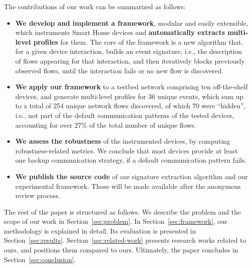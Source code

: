 The contributions of our work can be summarized as follows:
\begin{itemize}

\item \textbf{We develop and implement a framework},
modular and easily extensible,
which instruments Smart Home devices and \textbf{automatically extracts multi-level profiles} for them. The core of the framework is a new algorithm that, for a given device interaction, builds an event signature, i.e., the description of flows appearing for that interaction, and then iteratively blocks previously observed flows, until the interaction fails or no new flow is discovered.

\item \textbf{We apply our framework} to a testbed network comprising ten off-the-shelf devices,
and generate multi-level profiles for 36 unique events,
which sum up to a total of 254 unique network flows discovered,
of which 70 were ``hidden'', i.e., not part of the default communication patterns of the tested devices, accounting for over 27\% of the total number of unique flows.

\item \textbf{We assess the robustness} of the instrumented devices,
by computing robustness-related metrics.
We conclude that most devices provide at least one backup communication strategy,
if a default communication pattern fails.

\item \textbf{We publish the source code}
of our signature extraction algorithm and our experimental framework.
Those will be made available after the anonymous review process.
\end{itemize}

The rest of the paper is structured as follows. We describe the problem and the scope of our work in Section~\ref{sec:problem}.
In Section~\ref{sec:framework},
our methodology is explained in detail.
Its evaluation is presented in Section~\ref{sec:results}.
Section~\ref{sec:related-work} presents research works related to ours,
and positions them compared to ours.
Ultimately, the paper concludes in Section~\ref{sec:conclusion}.
